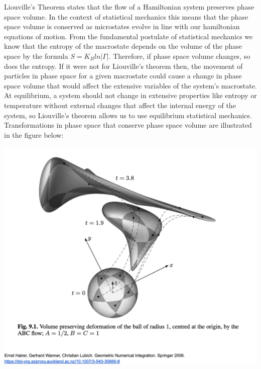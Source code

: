 Liouville’s Theorem states that the flow of a Hamiltonian system preserves phase space volume. In the context of statistical mechanics this means that the phase space volume is conserved as microstates evolve in line with our hamiltonian equations of motion. From the fundamental postulate of statistical mechanics we know that the entropy of the macrostate depends on the volume of the phase space by the formula $S = K_{B} ln |\Gamma| $. Therefore, if phase space volume changes, so does the entropy. If it were not for Liouville’s theorem then, the movement of particles in phase space for a given macrostate could cause a change in phase space volume that would affect the extensive variables of the system’s macrostate. At equilibrium, a system should not change in extensive properties like entropy or temperature without external changes that affect the internal energy of the system, so Liouville’s theorem allows us to use equilibrium statistical mechanics. Transformations in phase space that conserve phase space volume are illustrated in the figure below:

\begin{centering}

\includegraphics[scale=0.4]{aferLiouvillefigure.png}

\end{centering}

